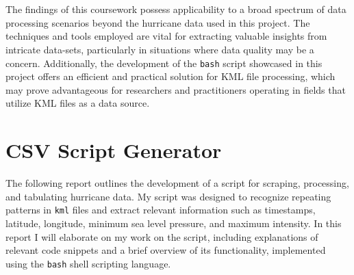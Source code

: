 \documentclass[]{article}
\begin{document}
    \\\\
    The findings of this coursework possess applicability to a broad spectrum of data processing scenarios beyond the hurricane data used in this project. The techniques and tools employed are vital for extracting valuable insights from intricate data-sets, particularly in situations where data quality may be a concern. Additionally, the development of the \verb|bash| script showcased in this project offers an efficient and practical solution for KML file processing, which may prove advantageous for researchers and practitioners operating in fields that utilize KML files as a data source.

    \section{CSV Script Generator}
    The following report outlines the development of a script for scraping, processing, and tabulating hurricane data. My script was designed to recognize repeating patterns in \verb|kml| files and extract relevant information such as timestamps, latitude, longitude, minimum sea level pressure, and maximum intensity. In this report I will elaborate on my work on the script, including explanations of relevant code snippets and a brief overview of its functionality, implemented using the \verb|bash| shell scripting language.
\end{document}
